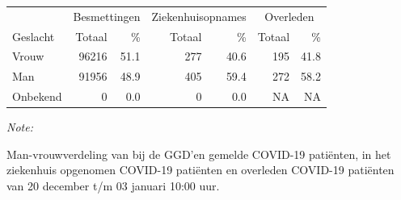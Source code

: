 \documentclass[
  english,
  man,floatsintext]{apa6}
\begin{document}
\begin{table}
\centering\begingroup\fontsize{11}{13}\selectfont

\begin{threeparttable}
\begin{tabular}{lrrrrrr}
\toprule
\multicolumn{1}{c}{ } & \multicolumn{2}{c}{Besmettingen} & \multicolumn{2}{c}{Ziekenhuisopnames} & \multicolumn{2}{c}{Overleden} \\
\cmidrule(l{3pt}r{3pt}){2-3} \cmidrule(l{3pt}r{3pt}){4-5} \cmidrule(l{3pt}r{3pt}){6-7}
Geslacht & Totaal & \% & Totaal & \% & Totaal & \%\\
\midrule
Vrouw & 96216 & 51.1 & 277 & 40.6 & 195 & 41.8\\
Man & 91956 & 48.9 & 405 & 59.4 & 272 & 58.2\\
Onbekend & 0 & 0.0 & 0 & 0.0 & NA & NA\\
\bottomrule
\end{tabular}
\begin{tablenotes}
\item \textit{Note: } 
\item Man-vrouwverdeling van bij de GGD’en gemelde COVID-19 patiënten, in het ziekenhuis opgenomen COVID-19 patiënten en overleden COVID-19 patiënten van 20 december t/m 03 januari 10:00 uur.
\end{tablenotes}
\end{threeparttable}
\endgroup{}
\end{table}
\newpage
\end{document}
